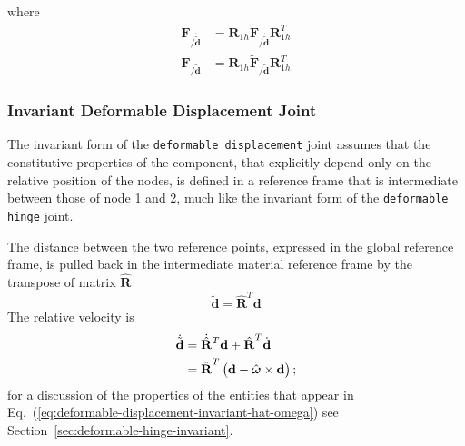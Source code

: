 \documentclass[10pt,dvips,fleqn,subeqn]{report}
\newcommand{\T}[1]{\bm{\mathbf{#1}}}
\newcommand{\TT}[1]{\bm{\mathbf{#1}}}
\begin{document}
where 
\begin{subequations}
\begin{align}
	\T{F}_{/\dot{\tilde{\T{d}}}} &= \T{R}_{1h} \tilde{\T{F}}_{/\dot{\tilde{\T{d}}}} \T{R}_{1h}^T \\
	\T{F}_{/\tilde{\T{d}}} &= \T{R}_{1h} \tilde{\T{F}}_{/\tilde{\T{d}}} \T{R}_{1h}^T
\end{align}
\end{subequations}



\subsubsection{Invariant Deformable Displacement Joint}
The invariant form of the \texttt{deformable displacement} joint
assumes that the constitutive properties of the component,
that explicitly depend only on the relative position 
of the nodes, is defined in a reference frame that is intermediate
between those of node 1 and 2, much like the invariant form
of the \texttt{deformable hinge} joint.

The distance between the two reference points, expressed
in the global reference frame, is pulled back in the 
intermediate material reference frame by the transpose
of matrix $\hat{\TT{R}}$
\begin{equation}
	\tilde{\T{d}} = \hat{\TT{R}}^T \T{d}
\end{equation}
The relative velocity is
\begin{align}
	\dot{\tilde{\T{d}}}
	&= \dot{\hat{\TT{R}}}^T \T{d} + \hat{\TT{R}}^T \dot{\T{d}}
		\nonumber \\
	&= \hat{\TT{R}}^T \plbr{
		\dot{\T{d}} - \hat{\T{\omega}} \times \T{d}
	} ;
\end{align}
for a discussion of the properties of the entities
that appear in Eq.~(\ref{eq:deformable-displacement-invariant-hat-omega})
see Section~\ref{sec:deformable-hinge-invariant}.
\end{document}
